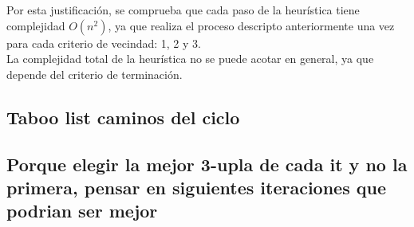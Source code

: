 Por esta justificaci\'on, se comprueba que cada paso de la heur\'istica tiene complejidad $O(n^2)$, ya que realiza el proceso descripto anteriormente una vez para cada criterio de vecindad: 1, 2 y 3.\\
La complejidad total de la heur\'istica no se puede acotar en general, ya que depende del criterio de terminaci\'on.


\subsection{Taboo list caminos del ciclo}
\subsection{Porque elegir la mejor 3-upla de cada it y no la primera, pensar en siguientes iteraciones que podrian ser mejor}